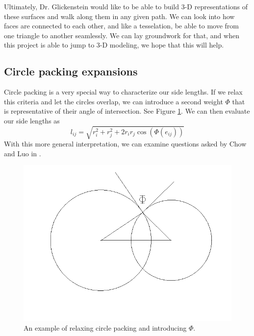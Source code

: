 \documentclass[12pt]{article}
\begin{document}
\noindent Ultimately, Dr. Glickenstein would like to be able to build 3-D representations of these surfaces and walk along them in any given path. We can look into how faces are connected to each other, and like a tesselation, be able to move from one triangle to another seamlessly. We can lay groundwork for that, and when this project is able to jump to 3-D modeling, we hope that this will help.  

\subsection{Circle packing expansions}
\label{circExt}
Circle packing is a very special way to characterize our side lengths. If we relax this criteria and let the circles overlap, we can introduce a second weight $\Phi$ that is representative of their angle of intersection. See Figure \ref{fig:intcirc}. We can then evaluate our side lengths as $$l_{ij} = \sqrt{r_i^2 + r_j^2 + 2r_ir_j\cos(\Phi(e_{ij}))}$$ With this more general interpretation, we can examine questions asked by Chow and Luo in \cite{chowluo}.  
%
\begin{figure}
\begin{center}
\includegraphics[scale = 0.6]{intcirc.png}
\end{center}
\caption{An example of relaxing circle packing and introducing $\Phi.$}
\label{fig:intcirc}
\end{figure}

\end{document}
